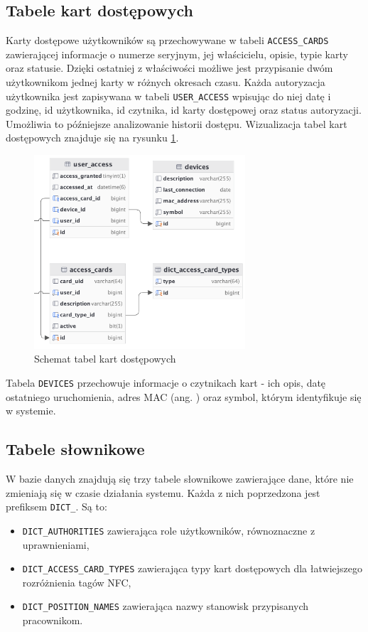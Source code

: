 \subsection{Tabele kart dostępowych}

Karty dostępowe użytkowników są przechowywane w tabeli \texttt{ACCESS\_CARDS} zawierającej informacje o numerze seryjnym, jej właścicielu, opisie, typie karty oraz statusie. Dzięki ostatniej z właściwości możliwe jest przypisanie dwóm użytkownikom jednej karty w różnych okresach czasu. Każda autoryzacja użytkownika jest zapisywana w tabeli \texttt{USER\_ACCESS} wpisując do niej datę i godzinę, id użytkownika, id czytnika, id karty dostępowej oraz status autoryzacji. Umożliwia to późniejsze analizowanie historii dostępu. Wizualizacja tabel kart dostępowych znajduje się na rysunku \ref{fig:accessCardsTable}.

\begin{figure}[H]
    \centering
    \includegraphics[width=0.7\textwidth]{graf/acTable.png}
    \caption{Schemat tabel kart dostępowych}
    \label{fig:accessCardsTable}
\end{figure}

Tabela \texttt{DEVICES} przechowuje informacje o czytnikach kart - ich opis, datę ostatniego uruchomienia, adres MAC (ang. ) oraz symbol, którym identyfikuje się w systemie.

\subsection{Tabele słownikowe}

W bazie danych znajdują się trzy tabele słownikowe zawierające dane, które nie zmieniają się w czasie działania systemu. Każda z nich poprzedzona jest prefiksem \texttt{DICT\_}. Są to:
\begin{itemize}
    \item \texttt{DICT\_AUTHORITIES} zawierająca role użytkowników, równoznaczne z uprawnieniami,
    \item \texttt{DICT\_ACCESS\_CARD\_TYPES} zawierająca typy kart dostępowych dla łatwiejszego rozróżnienia tagów NFC,
    \item \texttt{DICT\_POSITION\_NAMES} zawierająca nazwy stanowisk przypisanych pracownikom.
\end{itemize}

